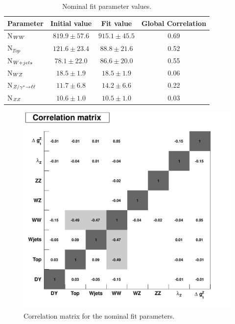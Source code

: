 \begin{table}[!ht]
  \begin{center}
 {\small
  \begin{tabular} {|l|c|c|c|}
\hline
  Parameter       &   Initial value & Fit value & Global Correlation \\
\hline
  N$_{WW}$       & $819.9\pm57.6$  & $915.1\pm45.5$ & 0.69 \\
  N$_{Top}$       & $121.6\pm23.4$  & $88.8\pm21.6$  & 0.52 \\
  N$_{W+jets}$    & $78.1\pm22.0$   & $86.6\pm20.0$ & 0.55 \\
  N$_{WZ}$       & $18.5\pm1.9$    & $18.5\pm1.9$   & 0.06 \\
  N$_{Z/\gamma^*\to\ell\ell}$     & $11.7\pm6.8$    & $14.2\pm6.6$   & 0.22 \\
  N$_{ZZ}$       & $10.6\pm1.0$    & $10.5\pm1.0$   & 0.03 \\
\hline
  \end{tabular}
  }
  \caption{Nominal fit parameter values.}
   \label{tab:fit_yields}
  \end{center}
\end{table}

\begin{figure}[tp]
  \centering
    \includegraphics[width=.60\textwidth]{figures/correlations}

  \caption[Fit parameter correlations] {Correlation matrix for the nominal fit parameters.}
  \label{fig:fit_correlations}
\end{figure}


